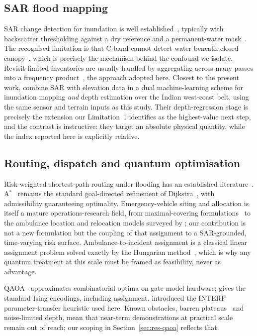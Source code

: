 \documentclass[10pt,twocolumn]{article}
\begin{document}
\subsection{SAR flood mapping}
SAR change detection for inundation is well established~\citep{martinis2009,
twele2016,shen2019}, typically with backscatter thresholding against a dry
reference and a permanent-water mask~\citep{pekel2016}. The recognised limitation
is that C-band cannot detect water beneath closed
canopy~\citep{townsend2002,tsyganskaya2018}, which is precisely the mechanism
behind the confound we isolate. Revisit-limited inventories are usually handled
by aggregating across many passes into a frequency
product~\citep{pekel2016,donchyts2016}, the approach adopted here.
Closest to the present work, \citet{sadhwani2026} combine SAR with elevation data
in a dual machine-learning scheme for inundation mapping \emph{and} depth
estimation over the Indian west-coast belt, using the same sensor and terrain
inputs as this study. Their depth-regression stage is precisely the extension our
Limitation~1 identifies as the highest-value next step, and the contrast is
instructive: they target an absolute physical quantity, while the index reported
here is explicitly relative.

\subsection{Routing, dispatch and quantum optimisation}
Risk-weighted shortest-path routing under flooding has an established
literature~\citep{zhang2019,yin2016}. A$^\ast$~\citep{hart1968} remains the
standard goal-directed refinement of Dijkstra~\citep{dijkstra1959}, with
admissibility guaranteeing optimality. Emergency-vehicle siting and allocation is
itself a mature operations-research field, from maximal-covering
formulations~\citep{church1974} to the ambulance location and relocation models
surveyed by \citet{brotcorne2003}; our contribution is not a new formulation but
the coupling of that assignment to a SAR-grounded, time-varying risk surface.
Ambulance-to-incident assignment is a classical linear assignment problem solved
exactly by the Hungarian method~\citep{kuhn1955}, which is why any quantum
treatment at this scale must be framed as feasibility, never as advantage.

QAOA~\citep{farhi2014} approximates combinatorial optima on gate-model hardware;
\citet{lucas2014} gives the standard Ising encodings, including assignment.
\citet{zhou2020} introduced the INTERP parameter-transfer heuristic used here.
Known obstacles, barren plateaus~\citep{mcclean2018} and noise-limited depth,
mean that near-term demonstrations at practical scale remain out of reach; our
scoping in Section~\ref{sec:res-qaoa} reflects that.
\end{document}
